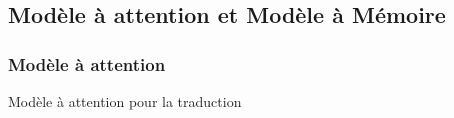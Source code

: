 \subsection{Modèle à attention et Modèle à Mémoire}



\begin{frame}
  \frametitle{Modèle à attention}
  Modèle à attention pour la traduction
  \begin{center}
    \href{https://demo.allennlp.org/reading-comprehension}{}
  \end{center}
\end{frame}


